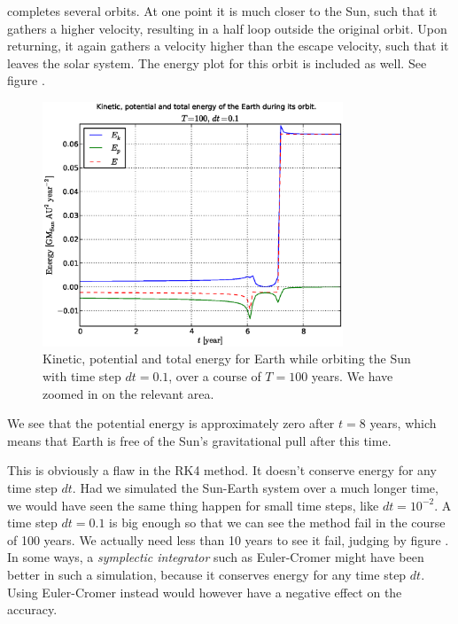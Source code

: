 completes several orbits. At one point it is much closer to the Sun, such
that it gathers a higher velocity, resulting in a half loop outside the original
orbit. Upon returning, it again gathers a velocity higher than the escape
velocity, such that it leaves the solar system. The energy plot for this orbit
is included as well. See figure .
%
\begin{figure}[htpb]
	\centering
	\includegraphics[width=0.8\textwidth]{figures/earth_energy_dt1e-1}
	\caption{Kinetic, potential and total energy for Earth while orbiting the
	Sun with time step $dt = 0.1$, over a course of $T = 100$ years.
	We have zoomed in on the relevant area.}
	\label{fig:energyconstdt0.1}
\end{figure}
%
We see that the potential energy is approximately zero after $t = 8$ years,
which means that Earth is free of the Sun's gravitational pull after this
time.

This is obviously a flaw in the RK4 method. It doesn't conserve energy for any
time step $dt$. Had we simulated the Sun-Earth system over a much longer time,
we would have seen the same thing happen for small time steps, like $dt =
10^{-2}$. 
A time step $dt = 0.1$ is big enough so that we can see the
method fail in the course of 100 years. We actually need less than 10 years
to see it fail, judging by figure . 
In some ways, a \emph{symplectic integrator} such as Euler-Cromer might have 
been better in such a simulation, because it conserves energy for any time step
$dt$. Using Euler-Cromer instead would however have a negative effect on the
accuracy.

